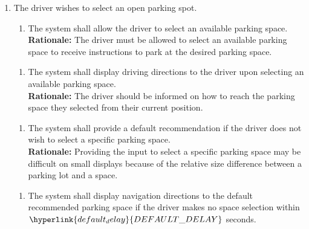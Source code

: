 \documentclass[12pt,letterpaper]{article}
\newcounter{businesseventnum}
\newcounter{funcreqnum}
\begin{document}
\begin{enumerate}[{BE}\thebusinesseventnum.] 
\item The driver wishes to select an open parking spot.
\begin{enumerate}[{FR}\thefuncreqnum.] 
    \item The system shall allow the driver to select an available parking
    space.\\
    \textbf{Rationale:} The driver must be allowed to select an available
    parking space to receive instructions to park at the desired parking space.
\end{enumerate}

\begin{enumerate}[{FR}\thefuncreqnum.] 
    \item The system shall display driving directions to the driver upon
    selecting an available parking space.\\
    \textbf{Rationale:} The driver should be informed on how to reach the
    parking space they selected from their current position.
\end{enumerate}

\begin{enumerate}[{FR}\thefuncreqnum.] 
    \item The system shall provide a default recommendation if the driver does
    not wish to select a specific parking space. \label{poc3}\\
    \textbf{Rationale:} Providing the input to select a specific parking space
    may be difficult on small displays because of the relative size difference
    between a parking lot and a space.
\end{enumerate}

\begin{enumerate}[{FR}\thefuncreqnum.] 
    \item The system shall display navigation directions to the default
    recommended parking space if the driver makes no space selection within
    $\hyperlink{default_delay}{DEFAULT\_DELAY}$ seconds.
\end{enumerate}
\end{enumerate}
\end{document}
